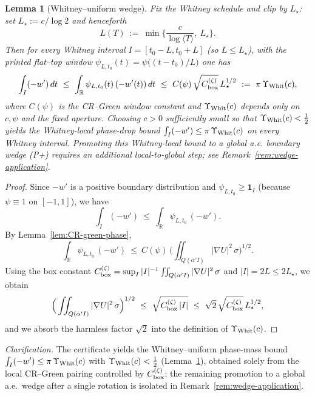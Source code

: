 \documentclass[11pt]{article}
\newtheorem{lemma}[theorem]{Lemma}
\theoremstyle{definition}
\theoremstyle{remark}
\theoremstyle{definition}
\newcommand{\R}{\mathbb{R}}
\begin{document}
\begin{lemma}[Whitney--uniform wedge]\label{lem:whitney-uniform-wedge}
Fix the Whitney schedule and clip by $L_\star$: set $L_\star:=c/\log 2$ and henceforth
\[
  L(T)\ :=\ \min\Big\{\frac{c}{\log\langle T\rangle},\ L_\star\Big\}.
\]
Then for every Whitney interval $I=[t_0-L,t_0+L]$ (so $L\le L_\star$), with the printed flat--top window $\psi_{L,t_0}(t)=\psi\big((t-t_0)/L\big)$ one has
\[
  \int_I (-w')\,dt\ \le\ \int_{\mathbb R} \psi_{L,t_0}(t)\,(-w'(t))\,dt\ \le\ C(\psi)\,\sqrt{C_{\rm box}^{(\zeta)}}\,L_\star^{1/2}
  \ :=\ \pi\,\Upsilon_{\rm Whit}(c),
\]
where $C(\psi)$ is the CR--Green window constant and $\Upsilon_{\rm Whit}(c)$ depends only on $c,\psi$ and the fixed aperture. Choosing $c>0$ sufficiently small so that $\Upsilon_{\rm Whit}(c)<\tfrac12$ yields the Whitney-local phase-drop bound $\int_I(-w')\le \pi\,\Upsilon_{\rm Whit}(c)$ on every Whitney interval. Promoting this Whitney-local bound to a \emph{global} a.e. boundary wedge \textup{(P+)} requires an additional local-to-global step; see Remark~\ref{rem:wedge-application}.
\end{lemma}
\begin{proof}
Since $-w'$ is a positive boundary distribution and $\psi_{L,t_0}\ge \mathbf 1_I$ (because $\psi\equiv 1$ on $[-1,1]$), we have
\[
  \int_I (-w')\ \le\ \int_{\R}\psi_{L,t_0}\,(-w').
\]
By Lemma~\ref{lem:CR-green-phase},
\[
  \int_{\R}\psi_{L,t_0}\,(-w')\ \le\ C(\psi)\,\Big(\iint_{Q(\alpha'I)}|\nabla U|^2\,\sigma\Big)^{1/2}.
\]
Using the box constant $C_{\rm box}^{(\zeta)}=\sup_I |I|^{-1}\iint_{Q(\alpha'I)}|\nabla U|^2\,\sigma$ and $|I|=2L\le 2L_\star$, we obtain
\[
  \Big(\iint_{Q(\alpha'I)}|\nabla U|^2\,\sigma\Big)^{1/2}\ \le\ \sqrt{C_{\rm box}^{(\zeta)}\,|I|}\ \le\ \sqrt{2}\,\sqrt{C_{\rm box}^{(\zeta)}}\,L_\star^{1/2},
\]
and we absorb the harmless factor $\sqrt2$ into the definition of $\Upsilon_{\rm Whit}(c)$.
\end{proof}

\noindent\emph{Clarification.} The certificate yields the Whitney–uniform phase-mass bound
\(\int_I (-w')\le \pi\,\Upsilon_{\rm Whit}(c)\) with $\Upsilon_{\rm Whit}(c)<\tfrac12$ (Lemma~\ref{lem:whitney-uniform-wedge}), obtained solely from the local CR--Green pairing controlled by $C_{\rm box}^{(\zeta)}$; the remaining promotion to a global a.e.\ wedge after a single rotation is isolated in Remark~\ref{rem:wedge-application}.
\end{document}
